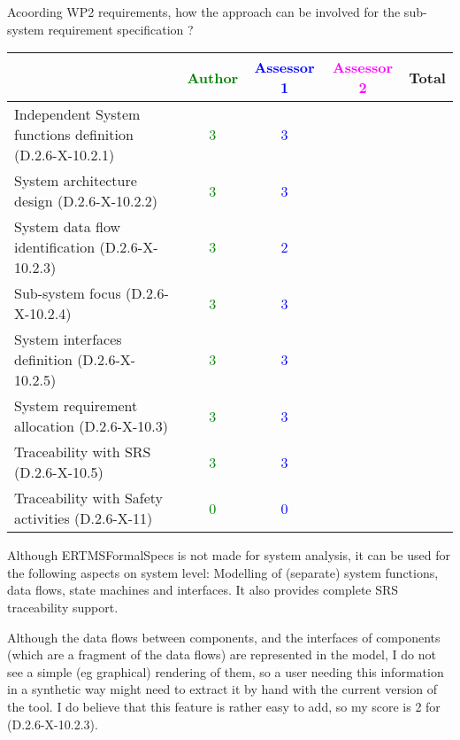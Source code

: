 Acoording WP2 requirements, how the approach can be involved for the sub-system requirement specification ?

\begin{tabular}{|l | c | c | c | c|}
\hline
& \textcolor{green}{Author} & \textcolor{blue}{Assessor 1} & \textcolor{magenta}{Assessor 2} & Total \\
\hline
Independent System functions definition (D.2.6-X-10.2.1)  & \textcolor{green}{3} & \textcolor{blue}{3} & &  \\
\hline 
System architecture design (D.2.6-X-10.2.2) & \textcolor{green}{3} & \textcolor{blue}{3} & &  \\
\hline
System data flow identification (D.2.6-X-10.2.3)  & \textcolor{green}{3} & \textcolor{blue}{2} & &  \\
\hline
Sub-system focus (D.2.6-X-10.2.4)  & \textcolor{green}{3} & \textcolor{blue}{3} & &  \\
\hline
System interfaces definition (D.2.6-X-10.2.5)  & \textcolor{green}{3} & \textcolor{blue}{3} & &  \\
\hline
System requirement allocation (D.2.6-X-10.3)  & \textcolor{green}{3} & \textcolor{blue}{3} & &  \\
\hline
Traceability with SRS (D.2.6-X-10.5)  & \textcolor{green}{3} & \textcolor{blue}{3} & &  \\
\hline
Traceability with Safety activities (D.2.6-X-11)  & \textcolor{green}{0} & \textcolor{blue}{0} & &  \\
\hline
\end{tabular}

\begin{author_comment}
Although ERTMSFormalSpecs is not made for system analysis, it can be used for the following aspects on system level: Modelling of (separate) system functions, data flows, state machines and interfaces. It also provides complete SRS traceability support.  
\end{author_comment}

\begin{assessor1}
Although the data flows between components, and the interfaces of components (which are a fragment of the data flows) are represented in the model, I do not see a simple (eg graphical) rendering of them, so a user needing this information in a synthetic way might need to extract it by hand with the current version of the tool. I do believe that this feature is rather easy to add, so my score is 2 for (D.2.6-X-10.2.3). 
\end{assessor1}

